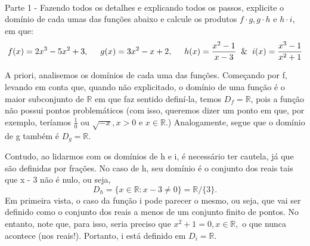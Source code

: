 \documentclass[exercícios_de_cálculo.tex]{subfiles}
\begin{document}
\paragraph{}Parte 1 - Fazendo todos os detalhes e explicando todos os passos, explicite o domínio de cada umas das funções abaixo e calcule os produtos $f\cdot{}g, g\cdot{}h \text{ e } h\cdot{}i$, em que:
$$
	f(x) = 2x^3 - 5x^2 + 3, \hspace{0.5cm}
	g(x) = 3x^2 - x + 2, \hspace{0.5cm}
	h(x) = \frac{x^2 - 1}{x - 3} \hspace{0.2cm} \text{\&} \hspace{0.2cm}
	i(x) = \frac{x^3 - 1}{x^2 + 1}
$$
\begin{sol*}
	A priori, analisemos os domínios de cada uma das funções. Começando por f, levando em conta que, quando não explicitado, o dom\'inio de uma função é o maior subconjunto de $\mathbb{R}$ em que faz sentido defin\'i-la, temos $D_f = \mathbb{R}$, pois a funç\~ao n\~ao possui pontos problemáticos (com isso, queremos dizer um ponto em que, por exemplo, ter\'iamos $\frac{1}{0}$ ou $\sqrt{-x}, x > 0$ e $x\in\mathbb{R}.$) Analogamente, segue que o dom\'inio de g também é $D_g = \mathbb{R}.$

	Contudo, ao lidarmos com os domínios de h e i, é necessário ter cautela, já que são definidas por frações. No caso de h, seu dom\'inio é o conjunto dos reais tais que x - 3 não é nulo, ou seja,
	$$
		D_h = \{x\in\mathbb{R}: x - 3 \neq 0\} = \mathbb{R}/\{3\}.
	$$
	Em primeira vista, o caso da função i pode parecer o mesmo, ou seja, que vai ser definido como o conjunto dos reais a menos de um conjunto finito de pontos. No entanto, note que, para isso, seria preciso que $x^2 + 1 = 0, x\in\mathbb{R},$ o que nunca acontece (nos reais!). Portanto, i está definido em $D_{i} = \mathbb{R}$.


\end{sol*}
\end{document}
